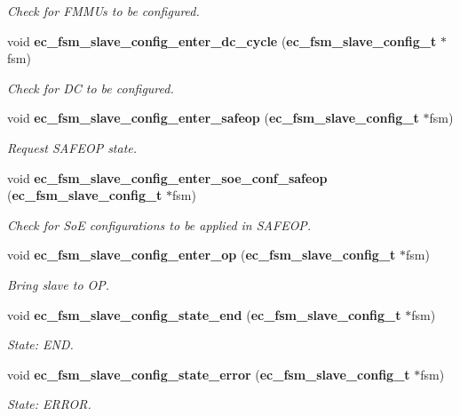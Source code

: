 \begin{DoxyCompactItemize}
\begin{DoxyCompactList}\small\item\em \-Check for \-F\-M\-M\-Us to be configured. \end{DoxyCompactList}\item 
void {\bf ec\-\_\-fsm\-\_\-slave\-\_\-config\-\_\-enter\-\_\-dc\-\_\-cycle} ({\bf ec\-\_\-fsm\-\_\-slave\-\_\-config\-\_\-t} $\ast$fsm)
\begin{DoxyCompactList}\small\item\em \-Check for \-D\-C to be configured. \end{DoxyCompactList}\item 
void {\bf ec\-\_\-fsm\-\_\-slave\-\_\-config\-\_\-enter\-\_\-safeop} ({\bf ec\-\_\-fsm\-\_\-slave\-\_\-config\-\_\-t} $\ast$fsm)
\begin{DoxyCompactList}\small\item\em \-Request \-S\-A\-F\-E\-O\-P state. \end{DoxyCompactList}\item 
void {\bf ec\-\_\-fsm\-\_\-slave\-\_\-config\-\_\-enter\-\_\-soe\-\_\-conf\-\_\-safeop} ({\bf ec\-\_\-fsm\-\_\-slave\-\_\-config\-\_\-t} $\ast$fsm)
\begin{DoxyCompactList}\small\item\em \-Check for \-So\-E configurations to be applied in \-S\-A\-F\-E\-O\-P. \end{DoxyCompactList}\item 
void {\bf ec\-\_\-fsm\-\_\-slave\-\_\-config\-\_\-enter\-\_\-op} ({\bf ec\-\_\-fsm\-\_\-slave\-\_\-config\-\_\-t} $\ast$fsm)
\begin{DoxyCompactList}\small\item\em \-Bring slave to \-O\-P. \end{DoxyCompactList}\item 
void {\bf ec\-\_\-fsm\-\_\-slave\-\_\-config\-\_\-state\-\_\-end} ({\bf ec\-\_\-fsm\-\_\-slave\-\_\-config\-\_\-t} $\ast$fsm)
\begin{DoxyCompactList}\small\item\em \-State\-: \-E\-N\-D. \end{DoxyCompactList}\item 
void {\bf ec\-\_\-fsm\-\_\-slave\-\_\-config\-\_\-state\-\_\-error} ({\bf ec\-\_\-fsm\-\_\-slave\-\_\-config\-\_\-t} $\ast$fsm)
\begin{DoxyCompactList}\small\item\em \-State\-: \-E\-R\-R\-O\-R. \end{DoxyCompactList}\item 

\end{DoxyCompactItemize}
